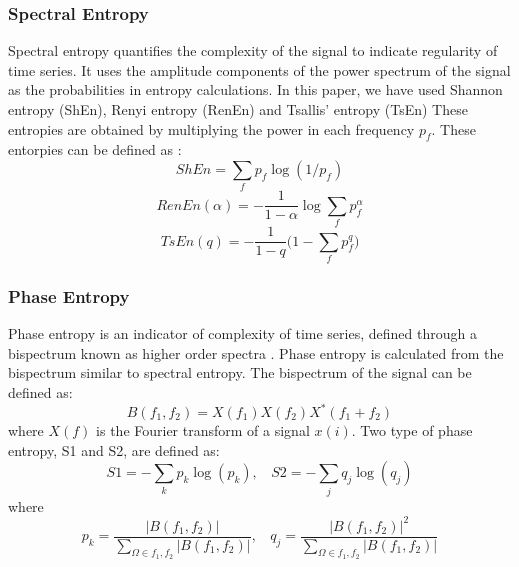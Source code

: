 \documentclass[letterpaper, 10 pt, conference]{ieeeconf}  %
\begin{document}
\subsubsection{Spectral Entropy}
Spectral entropy quantifies the complexity of the signal to indicate regularity of time series.
It uses the amplitude components of the power spectrum of the signal as the probabilities in entropy calculations. 
In this paper, we have used Shannon entropy (ShEn), Renyi entropy (RenEn) and Tsallis' entropy (TsEn)
These entropies are obtained by multiplying the power in each frequency $p_f$.
These entorpies can be defined as \cite{kannathal2005,renyi1961measures,chen2014tsallis}:
\begin{equation}
ShEn = \sum_f p_f \log  \left(1/p_f\right)
\end{equation}
\begin{equation}
RenEn(\alpha) = -\frac{1}{1-\alpha}\log  \sum_f p_f^\alpha 
\end{equation}
\begin{equation}
TsEn(q) = -\frac{1}{1-q}\biggl( 1 - \sum_f p_f^q \biggl)
\end{equation}

\subsubsection{Phase Entropy}
Phase entropy is an indicator of complexity of time series, defined through a bispectrum known as higher order spectra \cite{nikias1993}.
Phase entropy is calculated from the bispectrum similar to spectral entropy.
The bispectrum of the signal can be defined as:
\begin{equation}
B(f_1, f_2) = X(f_1)X(f_2)X^*(f_1 + f_2)
\end{equation}
where $X(f)$ is the Fourier transform of a signal $x(i)$.
Two type of phase entropy, S1 and S2, are defined as:
\begin{equation}
S1 = - \sum _k p_k \log (p_k), \:\:\:\: 
S2 = -\sum_j q_j \log (q_j)
\end{equation}
where
\begin{equation}
p_k = \frac{|B(f_1, f_2)|}{\sum_{\Omega \in f_1, f_2} |B(f_1, f_2)|}, \:\:\:\:
q_j = \frac{|B(f_1, f_2)|^2}{\sum_{ \Omega \in f_1, f_2 } |B(f_1, f_2)|}
\end{equation}
\end{document}
